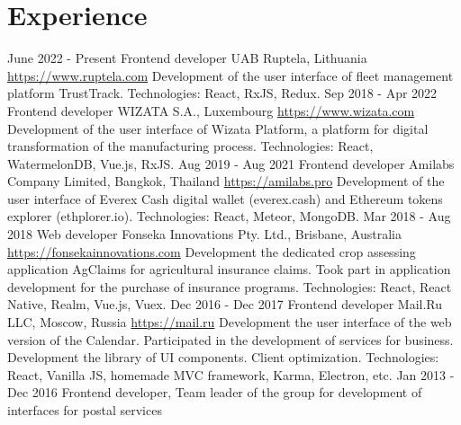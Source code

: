\documentclass[11pt,a4paper]{moderncv}
\begin{document}
\newpage

\section{Experience}
\cventry
  {June 2022 - Present}
  {Frontend developer}
  {UAB Ruptela, Lithuania}
  {\newline{}\url{https://www.ruptela.com}}{}
  {Development of the user interface of fleet management platform TrustTrack.\newline{}
  Technologies: React, RxJS, Redux.}
\cventry
  {Sep 2018 - Apr 2022}
  {Frontend developer}
  {WIZATA S.A., Luxembourg}
  {\newline{}\url{https://www.wizata.com}}{}
  {Development of the user interface of Wizata Platform, a platform for digital transformation of the manufacturing process.\newline{}
  Technologies: React, WatermelonDB, Vue.js, RxJS.}
\cventry
  {Aug 2019 - Aug 2021}
  {Frontend developer}
  {Amilabs Company Limited, Bangkok, Thailand}
  {\newline{}\url{https://amilabs.pro}}{}
  {Development of the user interface of Everex Cash digital wallet (everex.cash) and Ethereum tokens explorer (ethplorer.io).\newline{}
  Technologies: React, Meteor, MongoDB.}
\cventry
  {Mar 2018 - Aug 2018}
  {Web developer}
  {Fonseka Innovations Pty. Ltd., Brisbane, Australia}
  {\newline{}\url{https://fonsekainnovations.com}}{}
  {Development the dedicated crop assessing application AgClaims for agricultural insurance claims.\newline{}
  Took part in application development for the purchase of insurance programs.\newline{}
  Technologies: React, React Native, Realm, Vue.js, Vuex.}
\cventry
  {Dec 2016 - Dec 2017}
  {Frontend developer}
  {Mail.Ru LLC, Moscow, Russia}
  {\newline{}\url{https://mail.ru}}{}
  {Development the user interface of the web version of the Calendar.\newline{}
  Participated in the development of services for business.\newline{}
  Development the library of UI components. Client optimization.\newline{}
  Technologies: React, Vanilla JS, homemade MVC framework, Karma, Electron, etc.}
\cventry
  {Jan 2013 - Dec 2016}
  {Frontend developer, Team leader of the group for development of interfaces for postal services}
\end{document}
